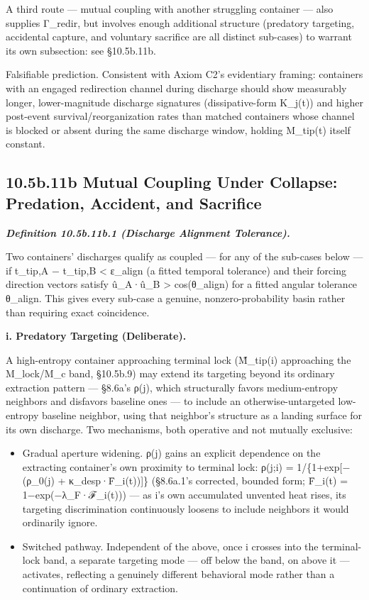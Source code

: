 \documentclass[
]{article}
\begin{document}
A third route --- mutual coupling with another struggling container ---
also supplies Γ\_redir, but involves enough additional structure
(predatory targeting, accidental capture, and voluntary sacrifice are
all distinct sub-cases) to warrant its own subsection: see §10.5b.11b.

Falsifiable prediction. Consistent with Axiom C2's evidentiary framing:
containers with an engaged redirection channel during discharge should
show measurably longer, lower-magnitude discharge signatures
(dissipative-form K\_j(t)) and higher post-event survival/reorganization
rates than matched containers whose channel is blocked or absent during
the same discharge window, holding M\_tip(t) itself constant.

\hypertarget{b.11b-mutual-coupling-under-collapse-predation-accident-and-sacrifice}{%
\subsection{10.5b.11b Mutual Coupling Under Collapse: Predation,
Accident, and
Sacrifice}\label{b.11b-mutual-coupling-under-collapse-predation-accident-and-sacrifice}}

\emph{\textbf{Definition 10.5b.11b.1 (Discharge Alignment Tolerance).}}

Two containers' discharges qualify as coupled --- for any of the
sub-cases below --- if t\_tip,A − t\_tip,B \textless{} ε\_align (a
fitted temporal tolerance) and their forcing direction vectors satisfy
û\_A·û\_B \textgreater{} cos(θ\_align) for a fitted angular tolerance
θ\_align. This gives every sub-case a genuine, nonzero-probability basin
rather than requiring exact coincidence.

\textbf{i. Predatory Targeting (Deliberate).}

A high-entropy container approaching terminal lock (M̃\_tip(i)
approaching the M\_lock/M\_c band, §10.5b.9) may extend its targeting
beyond its ordinary extraction pattern --- §8.6a's ρ(j), which
structurally favors medium-entropy neighbors and disfavors baseline ones
--- to include an otherwise-untargeted low-entropy baseline neighbor,
using that neighbor's structure as a landing surface for its own
discharge. Two mechanisms, both operative and not mutually exclusive:

\begin{itemize}
\item
  Gradual aperture widening. ρ(j) gains an explicit dependence on the
  extracting container's own proximity to terminal lock: ρ(j;i) =
  1/\{1+exp{[}−(ρ\_0(j) + κ\_desp·F̄\_i(t)){]}\} (§8.6a.1's corrected,
  bounded form; F̄\_i(t) = 1−exp(−λ\_F·ℱ\_i(t))) --- as i's own
  accumulated unvented heat rises, its targeting discrimination
  continuously loosens to include neighbors it would ordinarily ignore.
\item
  Switched pathway. Independent of the above, once i crosses into the
  terminal-lock band, a separate targeting mode --- off below the band,
  on above it --- activates, reflecting a genuinely different behavioral
  mode rather than a continuation of ordinary extraction.
\end{itemize}
\end{document}
